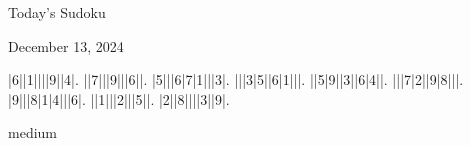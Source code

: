 \documentclass{article}
\begin{document}
\begin{center}
\Huge{Today's Sudoku}
\end{center}
\begin{center}
\Large{December 13, 2024}
\end{center}
\begin{sudoku}
|6||1||||9||4|.
||7|||9|||6||.
|5|||6|7|1|||3|.
|||3|5||6|1|||.
||5|9||3||6|4||.
|||7|2||9|8|||.
|9|||8|1|4|||6|.
||1|||2|||5||.
|2||8||||3||9|.
\end{sudoku}
\begin{center}
medium\end{center}
\end{document}
